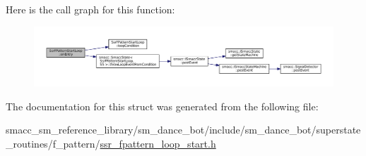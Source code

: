 Here is the call graph for this function\+:
\nopagebreak
\begin{figure}[H]
\begin{center}
\leavevmode
\includegraphics[width=350pt]{structSsrFPatternStartLoop_a03c8e22081b280dde05b22ebf707eb30_cgraph}
\end{center}
\end{figure}




The documentation for this struct was generated from the following file\+:\begin{DoxyCompactItemize}
\item 
smacc\+\_\+sm\+\_\+reference\+\_\+library/sm\+\_\+dance\+\_\+bot/include/sm\+\_\+dance\+\_\+bot/superstate\+\_\+routines/f\+\_\+pattern/\hyperlink{ssr__fpattern__loop__start_8h}{ssr\+\_\+fpattern\+\_\+loop\+\_\+start.\+h}\end{DoxyCompactItemize}

